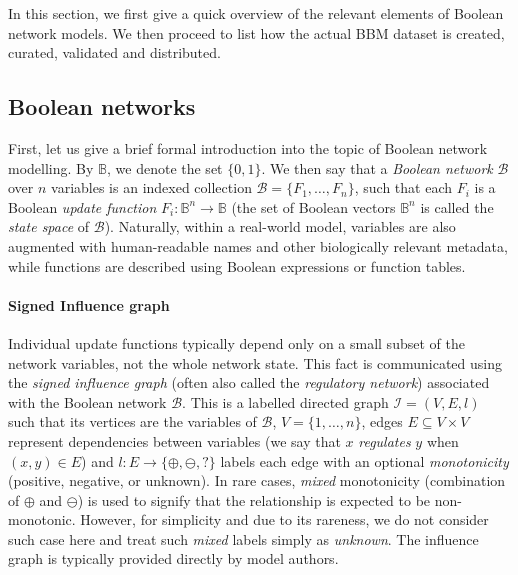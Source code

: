 \documentclass[fleqn,10pt]{wlscirep}
\begin{document}
In this section, we first give a quick overview of the relevant elements of Boolean network models. We then proceed to list how the actual BBM dataset is created, curated, validated and distributed.

\subsection*{Boolean networks}


First, let us give a brief formal introduction into the topic of Boolean network modelling. By $\mathbb{B}$, we denote the set $\{0,1\}$. We then say that a \emph{Boolean network} $\mathcal{B}$ over $n$ variables is an indexed collection $\mathcal{B} = \{ F_1, \ldots, F_n \}$, such that each $F_i$ is a Boolean \emph{update function} $F_i  : \mathbb{B}^n \to \mathbb{B}$ (the set of Boolean vectors $\mathbb{B}^n$ is called the \emph{state space} of $\mathcal{B}$). Naturally, within a real-world model, variables are also augmented with human-readable names and other biologically relevant metadata, while functions are described using Boolean expressions or function tables.

\paragraph{Signed Influence graph} Individual update functions typically depend only on a small subset of the network variables, not the whole network state. This fact is communicated using the \emph{signed influence graph} (often also called the \emph{regulatory network}) associated with the Boolean network $\mathcal{B}$. This is a labelled directed graph $\mathcal{I} = (V, E, l)$ such that its vertices are the variables of $\mathcal{B}$, $V = \{ 1, \ldots, n \}$, edges $E \subseteq V \times V$ represent dependencies between variables (we say that $x$ \emph{regulates} $y$ when $(x,y) \in E$) and $l : E \to \{ \oplus, \ominus, ? \}$ labels each edge with an optional \emph{monotonicity} (positive, negative, or unknown). In rare cases, \emph{mixed} monotonicity (combination of $\oplus$ and $\ominus$) is used to signify that the relationship is expected to be non-monotonic. However, for simplicity and due to its rareness, we do not consider such case here and treat such \emph{mixed} labels simply as \emph{unknown}. The influence graph is typically provided directly by model authors.
\end{document}
